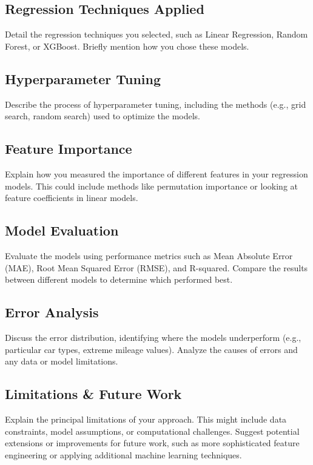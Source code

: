\documentclass[conference]{IEEEtran}
\begin{document}
\subsection{Regression Techniques Applied}
Detail the regression techniques you selected, such as Linear Regression, Random Forest, or XGBoost. Briefly mention how you chose these models.

\subsection{Hyperparameter Tuning}
Describe the process of hyperparameter tuning, including the methods (e.g., grid search, random search) used to optimize the models.

\subsection{Feature Importance}
Explain how you measured the importance of different features in your regression models. This could include methods like permutation importance or looking at feature coefficients in linear models.

\subsection{Model Evaluation}
\label{subsec:model_evaluation}
Evaluate the models using performance metrics such as Mean Absolute Error (MAE), Root Mean Squared Error (RMSE), and R-squared. Compare the results between different models to determine which performed best.

\subsection{Error Analysis}
\label{subsec:error_analysis}
Discuss the error distribution, identifying where the models underperform (e.g., particular car types, extreme mileage values). Analyze the causes of errors and any data or model limitations.

\subsection{Limitations \& Future Work}
\label{subsec:limitations}
Explain the principal limitations of your approach. This might include data constraints, model assumptions, or computational challenges. Suggest potential extensions or improvements for future work, such as more sophisticated feature engineering or applying additional machine learning techniques.
\end{document}
